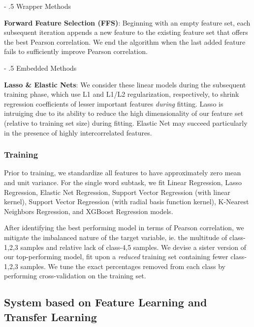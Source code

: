 \documentclass[11pt,a4paper]{article}
\makeatletter
\renewcommand\paragraph{%
    \@startsection{paragraph}{4}{0mm}%
        {-\baselineskip}%
        {.5\baselineskip}%
        {\normalfont\normalsize\bfseries}}
\makeatother
\begin{document}
\paragraph{Wrapper Methods}

\textbf{Forward Feature Selection (FFS)}: Beginning with an empty feature set, each subsequent iteration appends a new feature to the existing feature set that offers the best Pearson correlation. We end the algorithm when the last added feature fails to sufficiently improve Pearson correlation.

\paragraph{Embedded Methods}

\textbf{Lasso \& Elastic Nets}: We consider these linear models during the subsequent training phase, which use L1 and L1/L2 regularization, respectively, to shrink regression coefficients of lesser important features \textit{during} fitting. Lasso \citep{Tibshirani.x} is intruiging due to its ability to reduce the high dimensionality of our feature set (relative to training set size) during fitting. Elastic Net \citep{10.2307/3647580} may succeed particularly in the presence of highly intercorrelated features.

\subsubsection{Training}

Prior to training, we standardize all features to have approximately zero mean and unit variance. For the single word subtask, we fit Linear Regression, Lasso Regression, Elastic Net Regression, Support Vector Regression (with linear kernel),  Support Vector Regression (with radial basis function kernel), K-Nearest Neighbors Regression, and XGBoost Regression models. 

After identifying the best performing model in terms of Pearson correlation, we mitigate the imbalanced nature of the target variable, ie. the multitude of class-1,2,3 samples and relative lack of class-4,5 samples. We devise a sister version of our top-performing model, fit upon a \textit{reduced} training set containing fewer class-1,2,3 samples. We tune the exact percentages removed from each class by performing cross-validation on the training set.

\subsection{System based on Feature Learning and Transfer Learning}
\end{document}
